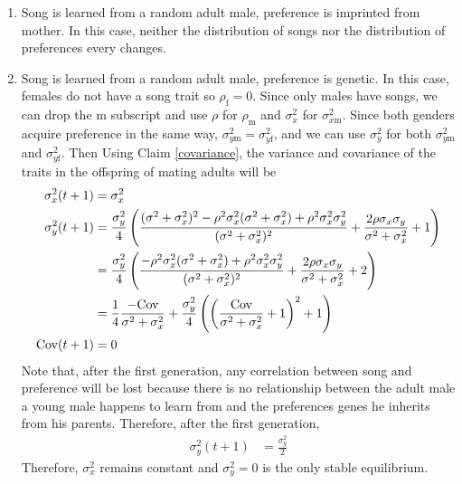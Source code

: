 \documentclass{article}
\newcommand{\x}[1]{\text{#1}}
\newcommand{\Cov}{\text{Cov}}
\begin{document}
\begin{enumerate}
\item Song is learned from a random adult male, preference is imprinted from mother. In this case, neither the distribution of songs nor the distribution of preferences every changes. 

\item Song is learned from a random adult male, preference is genetic. In this case, females do not have a song trait so $\rho_\x{f}=0$. Since only males have songs, we can drop the m subscript and use $\rho$ for $\rho_\x{m}$ and $\sigma_x^2$ for $\sigma_{x\x{m}}^2$. Since both genders acquire preference in the same way, $\sigma_{y\x{m}}^2=\sigma_{y\x{f}}^2$, and we can use $\sigma_y^2$ for both $\sigma_{y\x{m}}^2$ and $\sigma_{y\x{f}}^2$. Then Using Claim \ref{covariance}, the variance and covariance of the traits in the offspring of mating adults will be 
\begin{align}
\sigma_x^2(t+1)&=\sigma_x^2 \label{sigmax4}
\\ \sigma_y^2(t+1)&=\frac{\sigma_y^2}{4}\left(\frac{(\sigma^2+\sigma_x^2)^2-\rho^2\sigma_x^2(\sigma^2+\sigma_x^2)+\rho^2\sigma_x^2\sigma_y^2}{(\sigma^2+\sigma_x^2)^2}+\frac{2\rho\sigma_x\sigma_y}{\sigma^2+\sigma_x^2}+1\right) \notag
\\&=\frac{\sigma_y^2}{4}\left(\frac{-\rho^2\sigma_x^2(\sigma^2+\sigma_x^2)+\rho^2\sigma_x^2\sigma_y^2}{(\sigma^2+\sigma_x^2)^2}+\frac{2\rho\sigma_x\sigma_y}{\sigma^2+\sigma_x^2}+2\right)  \notag
\\&=\frac{1}{4}\frac{-\Cov}{\sigma^2+\sigma_x^2}+\frac{\sigma_y^2}{4}\left(\left(\frac{\Cov}{\sigma^2+\sigma_x^2}+1\right)^2+1\right) \label{sigmay4}
\\ \Cov(t+1)&=0
\end{align}
Note that, after the first generation, any correlation between song and preference will be lost because there is no relationship between the adult male a young male happens to learn from and the preferences genes he inherits from his parents. Therefore, after the first generation,
\begin{align*}
\sigma_y^2(t+1)&=\frac{\sigma_y^2}{2}
\end{align*}
Therefore, $\sigma_x^2$ remains constant and $\sigma_y^2=0$ is the only stable equilibrium.



\end{enumerate}
\end{document}
